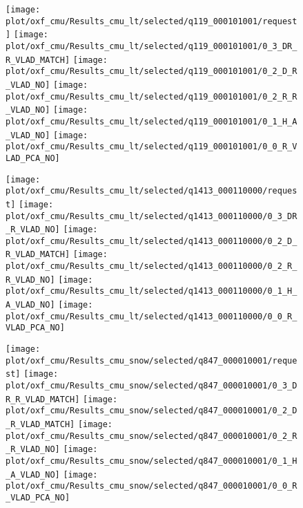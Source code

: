 \begin{figure}
	\begin{minipage}{0.01\textwidth}
	\end{minipage}
	\begin{minipage}{0.95\textwidth}
		\center
		\texttt{[image: plot/oxf\_cmu/Results\_cmu\_lt/selected/q119\_000101001/request]}
		\texttt{[image: plot/oxf\_cmu/Results\_cmu\_lt/selected/q119\_000101001/0\_3\_DR\_R\_VLAD\_MATCH]}
		\texttt{[image: plot/oxf\_cmu/Results\_cmu\_lt/selected/q119\_000101001/0\_2\_D\_R\_VLAD\_NO]}	
		\texttt{[image: plot/oxf\_cmu/Results\_cmu\_lt/selected/q119\_000101001/0\_2\_R\_R\_VLAD\_NO]}	
		\texttt{[image: plot/oxf\_cmu/Results\_cmu\_lt/selected/q119\_000101001/0\_1\_H\_A\_VLAD\_NO]}	
		\texttt{[image: plot/oxf\_cmu/Results\_cmu\_lt/selected/q119\_000101001/0\_0\_R\_VLAD\_PCA\_NO]}
		
		\texttt{[image: plot/oxf\_cmu/Results\_cmu\_lt/selected/q1413\_000110000/request]}
		\texttt{[image: plot/oxf\_cmu/Results\_cmu\_lt/selected/q1413\_000110000/0\_3\_DR\_R\_VLAD\_NO]}
		\texttt{[image: plot/oxf\_cmu/Results\_cmu\_lt/selected/q1413\_000110000/0\_2\_D\_R\_VLAD\_MATCH]}
		\texttt{[image: plot/oxf\_cmu/Results\_cmu\_lt/selected/q1413\_000110000/0\_2\_R\_R\_VLAD\_NO]}
		\texttt{[image: plot/oxf\_cmu/Results\_cmu\_lt/selected/q1413\_000110000/0\_1\_H\_A\_VLAD\_NO]}
		\texttt{[image: plot/oxf\_cmu/Results\_cmu\_lt/selected/q1413\_000110000/0\_0\_R\_VLAD\_PCA\_NO]}
	\end{minipage}
	
	\begin{minipage}{0.01\textwidth}
	\end{minipage}
	\begin{minipage}{0.95\textwidth}
		\center
		\texttt{[image: plot/oxf\_cmu/Results\_cmu\_snow/selected/q847\_000010001/request]}
		\texttt{[image: plot/oxf\_cmu/Results\_cmu\_snow/selected/q847\_000010001/0\_3\_DR\_R\_VLAD\_MATCH]}
		\texttt{[image: plot/oxf\_cmu/Results\_cmu\_snow/selected/q847\_000010001/0\_2\_D\_R\_VLAD\_MATCH]}	
		\texttt{[image: plot/oxf\_cmu/Results\_cmu\_snow/selected/q847\_000010001/0\_2\_R\_R\_VLAD\_NO]}	
		\texttt{[image: plot/oxf\_cmu/Results\_cmu\_snow/selected/q847\_000010001/0\_1\_H\_A\_VLAD\_NO]}	
		\texttt{[image: plot/oxf\_cmu/Results\_cmu\_snow/selected/q847\_000010001/0\_0\_R\_VLAD\_PCA\_NO]}
		

\end{minipage}
\end{figure}
